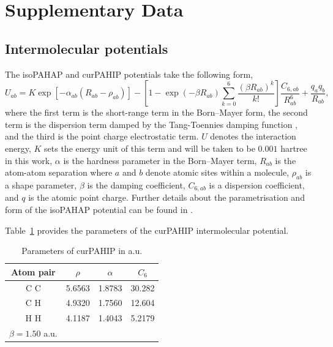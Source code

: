 
\renewcommand{\thefigure}{A\arabic{figure}}
\setcounter{figure}{0}
\renewcommand{\thetable}{A\arabic{table}}
\setcounter{table}{0}

\section{Supplementary Data}
\label{supplinfo}


\subsection{Intermolecular potentials}
\label{sec:SIpotentials}

The isoPAHAP and curPAHIP potentials take the following form, 
%
\begin{equation}
\label{eqn:isoPAHAP}
U_{ab} = K \exp \left[ - \alpha_{ab} \left( R_{ab} - \rho_{ab} \right) \right] - \left[ 1 - \exp \left( - \beta R_{ab} \right) \sum_{k=0}^{6} \frac{ \left( \beta R_{ab} \right) ^{k}}{k!} \right] \frac{C_{6,ab}}{R_{ab}^{6}} + \frac{q_{a} q_{b}}{R_{ab}},
\end{equation}
%
where the first term is the short-range term in the Born--Mayer form, the second term is the dispersion term damped by the Tang-Toennies damping function \citep{Tang1984}, and the third is the point charge electrostatic term. $U$ denotes the interaction energy, $K$ sets the energy unit of this term and will be taken to be $0.001$ hartree in this work, $\alpha$ is the hardness parameter in the Born--Mayer term, $R_{ab}$ is the atom-atom separation where $a$ and $b$ denote atomic sites within a molecule, $\rho_{ab}$ is a shape parameter, $\beta$ is the damping coefficient, $C_{6,ab}$ is a dispersion coefficient, and $q$ is the atomic point charge. Further details about the parametrisation and form of the isoPAHAP potential can be found in \citet{totton2010first}.

Table~\ref{table:curPAHAPparams} provides the parameters of the curPAHIP intermolecular potential. 
%
\begin{table}[h!tb]
\centering
\caption{Parameters of curPAHIP in a.u.}
\label{table:curPAHAPparams}
\begin{tabular}{cccc}
\hline
Atom pair & $\rho $   & $\alpha$ 	&	$C_{6}$  \\ \hline
C C       & 5.6563 & 1.8783 & 30.282  \\
C H       & 4.9320 & 1.7560 & 12.604  \\
H H       & 4.1187 & 1.4043 & 5.2179  \\ \hline
$\beta = 1.50$ a.u.
\end{tabular}
\end{table}


